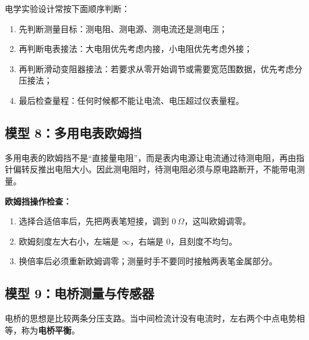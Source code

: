 电学实验设计常按下面顺序判断：
\begin{enumerate}
  \item 先判断测量目标：测电阻、测电源、测电流还是测电压；
  \item 再判断电表接法：大电阻优先考虑内接，小电阻优先考虑外接；
  \item 再判断滑动变阻器接法：若要求从零开始调节或需要宽范围数据，优先考虑分压接法；
  \item 最后检查量程：任何时候都不能让电流、电压超过仪表量程。
\end{enumerate}

\subsection*{模型 8：多用电表欧姆挡}

多用电表的欧姆挡不是“直接量电阻”，而是表内电源让电流通过待测电阻，再由指针偏转反推出电阻大小。因此测电阻时，待测电阻必须与原电路断开，不能带电测量。

\begin{center}


\label{fig:multimeter-ohm-range}
\end{center}

\textbf{欧姆挡操作检查：}
\begin{enumerate}
  \item 选择合适倍率后，先把两表笔短接，调到 $0\ \Omega$，这叫欧姆调零。
  \item 欧姆刻度左大右小，左端是 $\infty$，右端是 $0$，且刻度不均匀。
  \item 换倍率后必须重新欧姆调零；测量时手不要同时接触两表笔金属部分。
\end{enumerate}

\subsection*{模型 9：电桥测量与传感器}

电桥的思想是比较两条分压支路。当中间检流计没有电流时，左右两个中点电势相等，称为\textbf{电桥平衡}。

\begin{center}


\label{fig:wheatstone-bridge}
\end{center}

